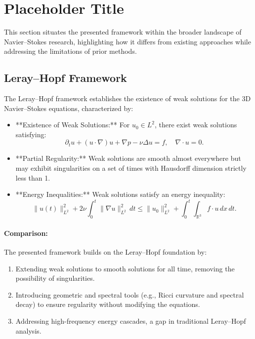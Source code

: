 \section{Placeholder Title}

This section situates the presented framework within the broader landscape of Navier--Stokes research, highlighting how it differs from existing approaches while addressing the limitations of prior methods.

\subsection{Leray--Hopf Framework}

The Leray--Hopf framework establishes the existence of weak solutions for the 3D Navier--Stokes equations, characterized by:
\begin{itemize}
    \item **Existence of Weak Solutions:** For $u_0 \in L^2$, there exist weak solutions satisfying:
    \begin{equation}
    \partial_t u + (u \cdot \nabla)u + \nabla p - \nu \Delta u = f, \quad \nabla \cdot u = 0.
    \end{equation}
    \item **Partial Regularity:** Weak solutions are smooth almost everywhere but may exhibit singularities on a set of times with Hausdorff dimension strictly less than 1.
    \item **Energy Inequalities:** Weak solutions satisfy an energy inequality:
    \begin{equation}
    \|u(t)\|_{L^2}^2 + 2\nu \int_0^t \|\nabla u\|_{L^2}^2 \, dt \leq \|u_0\|_{L^2}^2 + \int_0^t \int_{\mathbb{R}^3} f \cdot u \, dx \, dt.
    \end{equation}
\end{itemize}

\paragraph{Comparison:}
The presented framework builds on the Leray--Hopf foundation by:
\begin{enumerate}
    \item Extending weak solutions to smooth solutions for all time, removing the possibility of singularities.
    \item Introducing geometric and spectral tools (e.g., Ricci curvature and spectral decay) to ensure regularity without modifying the equations.
    \item Addressing high-frequency energy cascades, a gap in traditional Leray--Hopf analysis.
\end{enumerate}

